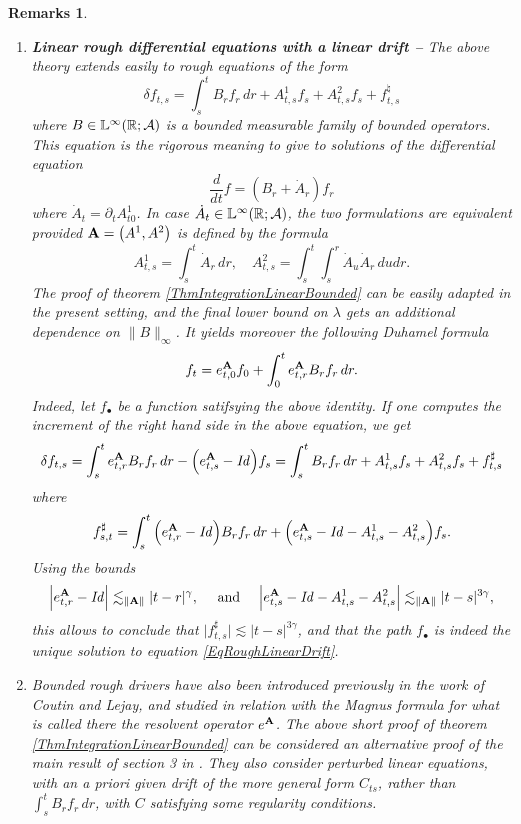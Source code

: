 \documentclass[11pt,a4paper]{amsart}
\newcommand{\RR}{\mathbb{R}}  \newcommand{\CC}{\mathbb{C}}  \newcommand{\LL}{\mathbb{L}}  \newcommand{\WW}{\mathbb{W}}
\newtheorem{rems}[thm]{{\sc Remarks}}
\numberwithin{equation}{section} %
\begin{document}
\begin{rems}
\begin{enumerate}
   \item {\bf Linear rough differential equations with a linear drift -- } The above theory extends easily to rough equations of the form
\begin{equation}
\label{EqRoughLinearDrift}
\delta f_{t, s} = \int_s^t B_r f_r\,dr + A^1_{t, s} f_s + A^2_{t, s} f_s + f^{\natural}_{t, s}
\end{equation}
where $B \in \LL^{\infty} (\RR; \mcA)$ is a bounded measurable family of bounded operators. This equation is the rigorous meaning to give to solutions of the differential equation
$$
\frac{d}{dt} f = (B_r + \dot{A}_r) f_r
$$
where $\dot{A}_t = \partial_t A_{t0}^1$. In case $\dot{A}_t \in \LL^{\infty} (\RR; \mcA)$, the two formulations are equivalent provided ${\bf A} = \big(A^1, A^2\big)$ is defined by the formula
$$ 
A^1_{t, s} = \int_s^t \dot{A}_r \,dr, \quad A^2_{t, s} = \int_s^t \int_s^r \dot{A}_u \dot{A}_r \,du dr.
$$
The proof of theorem \ref{ThmIntegrationLinearBounded} can be easily adapted in the present setting, and the final lower bound on $\lambda$ gets an additional dependence on $\| B \|_\infty$. It yields moreover the following Duhamel formula
$$
f_t = e^{\bf A}_{t, 0} f_0 + \int_0^t e^{\bf A}_{t, r} B_r f_r\,dr.
$$
Indeed, let $f_\bullet$ be a function satifsying the above identity. If one computes the increment of the right hand side in the above equation, we get
$$
\delta f_{t, s} = \int_s^t e^{\bf A}_{t, r} B_r f_r \,dr - \Big(e^{\bf A}_{t, s} -\textrm{\emph{Id}}\Big) f_s = \int_s^t B_r f_r \,dr + A^1_{t, s} f_s + A^2_{t, s} f_s + f^\sharp_{t, s}
$$
where
$$
f^\sharp_{s, t} = \int_s^t \Big(e^{\bf A}_{t, r} -\textrm{\emph{Id}}\Big) B_r f_r \,dr + \Big(e^{\bf A}_{t, s} -\textrm{\emph{Id}} - A^1_{t, s} - A^2_{t, s}\Big) f_s.
$$
Using the bounds
$$
\Big| e^{\bf A}_{t, r} -\textrm{\emph{Id}}\Big| \lesssim_{\|{\bf A}\|} | t -  r |^{\gamma}, \quad \textrm{ and }\quad  \Big| e^{\bf A}_{t, s}  -\textrm{\emph{Id}} - A^1_{t, s} - A^2_{t, s} \Big| \lesssim_{\| {\bf A} \|} | t - s |^{3 \gamma},
$$
this allows to conclude that $\big|f^{\sharp}_{t, s}\big| \lesssim | t - s |^{3\gamma}$, and that the path $f_\bullet$ is indeed the unique solution to equation \eqref{EqRoughLinearDrift}. \vspace{0.2cm}

   \item Bounded rough drivers have also been introduced previously in the work \cite{CoutinLejayLinear} of Coutin and Lejay, and studied in relation with the Magnus formula for what is called there the \emph{resolvent operator} $e^{\bf A}$. The above short proof of theorem \ref{ThmIntegrationLinearBounded} can be considered an alternative proof of the main result of section 3 in \cite{CoutinLejayLinear}. They also consider perturbed linear equations, with an a priori given drift of the more general form $C_{ts}$, rather than $\int_s^t B_rf_r\,dr$, with $C$ satisfying some regularity conditions.
\end{enumerate}
\end{rems}
\end{document}
